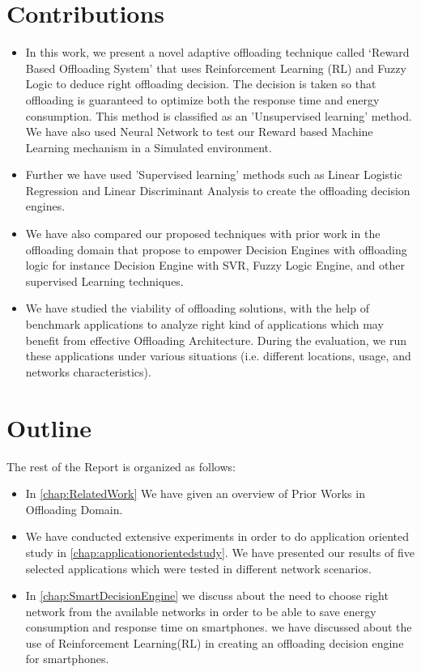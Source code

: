 \documentclass{report}
\begin{document}
\section{Contributions}
\begin{itemize} 

\item In this work, we present a novel adaptive offloading technique called ‘Reward Based Offloading System’ that uses Reinforcement Learning (RL) and Fuzzy Logic to deduce right offloading decision. The decision is taken so that offloading is guaranteed to optimize both the response time and energy consumption. This method is classified as an 'Unsupervised learning' method. We have also used Neural Network to test our Reward based Machine Learning mechanism in a Simulated environment.
\item Further we have used 'Supervised learning' methods such as Linear Logistic Regression and Linear Discriminant Analysis to create the offloading decision engines. 
\item We have also compared our proposed techniques with prior work in the offloading domain that propose to empower Decision Engines with offloading logic for instance Decision Engine with SVR, Fuzzy Logic Engine, and other supervised Learning techniques.
\item We have studied the viability of offloading solutions, with the help of benchmark applications to analyze right kind of applications which may benefit from effective Offloading Architecture. During the evaluation, we run these applications under various situations (i.e. different locations, usage, and networks characteristics).


\end{itemize}
\section{Outline}
The rest of the Report is organized as follows:
\begin{itemize}
	
	
	\item In \autoref{chap:RelatedWork} We have given an overview of Prior Works in Offloading Domain.
	\item We have conducted extensive experiments in order to do application oriented study in \autoref{chap:applicationorientedstudy}. We have presented our results of five selected applications which were tested in different network scenarios. 
 
	\item In \autoref{chap:SmartDecisionEngine} we discuss about the need to choose right network from the available networks in order to be able to save energy consumption and response time on smartphones. we have discussed about the use of Reinforcement Learning(RL) in creating an offloading decision engine for smartphones.
	

\end{itemize}
\end{document}
